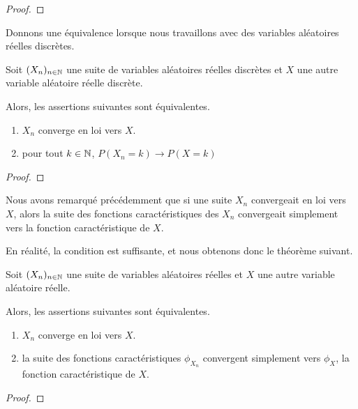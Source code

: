 \ifdefined\outputproof
\begin{proof}

\end{proof}
\fi

Donnons une équivalence lorsque nous travaillons avec des variables aléatoires
réelles discrètes.

\begin{proposition}
	Soit $(X_{n})_{n \in \mathbb{N}}$ une suite de variables aléatoires réelles
	discrètes et $X$ une autre variable aléatoire réelle discrète.

	Alors, les assertions suivantes sont équivalentes.

	\begin{enumerate}
		\item $X_{n}$ converge en loi vers $X$.
		\item pour tout $k \in \mathbb{N}$, $P(X_{n} = k) \rightarrow P(X = k)$
	\end{enumerate}
\end{proposition}

\ifdefined\outputproof
\begin{proof}

\end{proof}
\fi

Nous avons remarqué précédemment que si une suite $X_{n}$ convergeait
en loi vers $X$, alors la suite des fonctions caractéristiques des $X_{n}$
convergeait simplement vers la fonction caractéristique de $X$.

En réalité, la condition est suffisante, et nous obtenons donc le théorème suivant.

\begin{theorem} 
	Soit $(X_{n})_{n \in \mathbb{N}}$ une suite de variables aléatoires réelles et
	$X$ une autre variable aléatoire réelle.

	Alors, les assertions suivantes sont équivalentes.

	\begin{enumerate}
		\item $X_{n}$ converge en loi vers $X$.
		\item la suite des fonctions caractéristiques $\phi_{X_{n}}$ convergent
			simplement vers $\phi_{X}$, la fonction caractéristique de $X$.
	\end{enumerate}
\end{theorem}

\ifdefined\outputproof
\begin{proof}

\end{proof}
\fi

